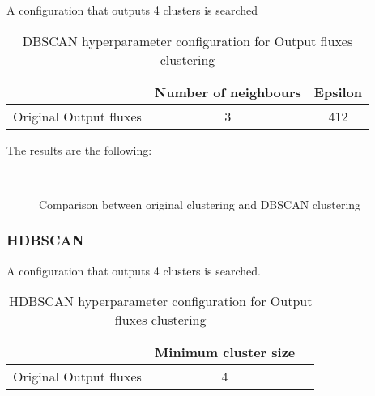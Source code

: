 			A configuration that outputs 4 clusters is searched
			
			\begin{table}[h!]
				\centering
				\begin{tabular}{|c|c|c|}
					\hline
					& \textbf{Number of neighbours} & \textbf{Epsilon}\\
					\hline
					Original Output fluxes & 3 & 412\\
					\hline
				\end{tabular}
				\caption{DBSCAN hyperparameter configuration for Output fluxes clustering}
			\end{table}
		
			The results are the following:
			
			\begin{figure*}[ht!]
				\centering
				\hspace{\fill}
				\\
					
				\hspace{\fill}
				\caption{Comparison between original clustering and DBSCAN clustering}
			\end{figure*}
			\FloatBarrier
		
		\subsubsection{HDBSCAN}
			
			A configuration that outputs 4 clusters is searched.
			
			\begin{table}[h!]
				\centering
				\begin{tabular}{|c|c|c|}
					\hline
					& \textbf{Minimum cluster size} \\
					\hline
					Original Output fluxes & 4 \\
					\hline
				\end{tabular}
				\caption{HDBSCAN hyperparameter configuration for Output fluxes clustering}
			\end{table}
			\FloatBarrier
			
